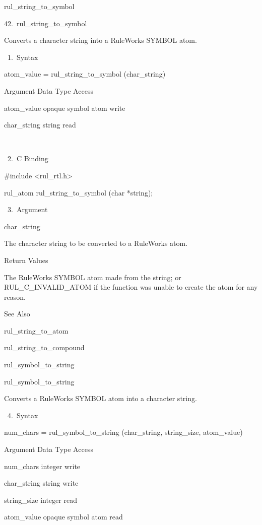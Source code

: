 {    rul_string_to_symbol

42. rul_string_to_symbol

    Converts a character string into a
    RuleWorks SYMBOL atom.

       1. Syntax

          atom_value = rul_string_to_symbol
          (char_string)

          Argument  Data Type    Access

          atom_value  opaque symbol atom
           write

          char_string  string    read

           

       2. C Binding

          #include <rul_rtl.h>

          rul_atom rul_string_to_symbol (char
          *string);

       3. Argument

          char_string

          The character string to be converted
          to a RuleWorks atom.

          Return Values

          The RuleWorks SYMBOL atom made from
          the string; or RUL_C_INVALID_ATOM if
          the function was unable to create
          the atom for any reason.

          See Also

          rul_string_to_atom

          rul_string_to_compound

          rul_symbol_to_string

          rul_symbol_to_string

          Converts a RuleWorks SYMBOL atom
          into a character string.

       4. Syntax

          num_chars = rul_symbol_to_string
          (char_string, string_size,
          atom_value)

          Argument  Data Type    Access

          num_chars  integer    write

          char_string  string    write

          string_size  integer    read

          atom_value  opaque symbol atom  read

           

}
